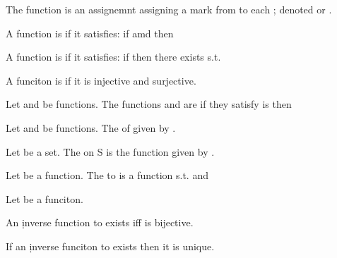 The function  is an assignemnt assigning a mark  from  to each ; denoted  or . 

\begin{D} A function  is  if it satisfies: if  amd  then  \end{D}
\begin{D} A function  is  if it satisfies: if  then there exists  s.t.  \end{D}
\begin{D} A funciton is  if it is injective and surjective. \end{D}
\begin{D} Let  and  be functions. The functions  and  are  if they satisfy is  then  \end{D}
\begin{D} Let  and  be functions. The  of  given by . \end{D}
\begin{D} Let  be a set. The  on S is the function  given by . \end{D}
\begin{D} Let  be a function. The  to  is a function  s.t.  and  \end{D}


\begin{T} Let  be a funciton. \begin{compactitem}
\item An \d{inverse function} to  exists iff  is bijective.
\item If an \d{inverse funciton} to  exists then it is unique.
\end{compactitem}
\end{T}

